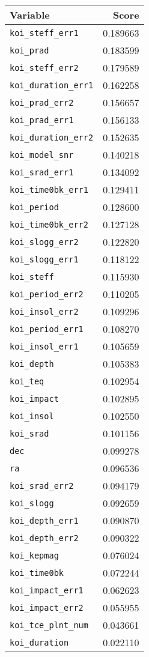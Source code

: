 \begin{tabular}{lr}
\toprule
                     Variable &     Score \\
\midrule
    \texttt{koi\_steff\_err1} &  0.189663 \\
           \texttt{koi\_prad} &  0.183599 \\
    \texttt{koi\_steff\_err2} &  0.179589 \\
 \texttt{koi\_duration\_err1} &  0.162258 \\
     \texttt{koi\_prad\_err2} &  0.156657 \\
     \texttt{koi\_prad\_err1} &  0.156133 \\
 \texttt{koi\_duration\_err2} &  0.152635 \\
     \texttt{koi\_model\_snr} &  0.140218 \\
     \texttt{koi\_srad\_err1} &  0.134092 \\
  \texttt{koi\_time0bk\_err1} &  0.129411 \\
         \texttt{koi\_period} &  0.128600 \\
  \texttt{koi\_time0bk\_err2} &  0.127128 \\
    \texttt{koi\_slogg\_err2} &  0.122820 \\
    \texttt{koi\_slogg\_err1} &  0.118122 \\
          \texttt{koi\_steff} &  0.115930 \\
   \texttt{koi\_period\_err2} &  0.110205 \\
    \texttt{koi\_insol\_err2} &  0.109296 \\
   \texttt{koi\_period\_err1} &  0.108270 \\
    \texttt{koi\_insol\_err1} &  0.105659 \\
          \texttt{koi\_depth} &  0.105383 \\
            \texttt{koi\_teq} &  0.102954 \\
         \texttt{koi\_impact} &  0.102895 \\
          \texttt{koi\_insol} &  0.102550 \\
           \texttt{koi\_srad} &  0.101156 \\
                 \texttt{dec} &  0.099278 \\
                  \texttt{ra} &  0.096536 \\
     \texttt{koi\_srad\_err2} &  0.094179 \\
          \texttt{koi\_slogg} &  0.092659 \\
    \texttt{koi\_depth\_err1} &  0.090870 \\
    \texttt{koi\_depth\_err2} &  0.090322 \\
         \texttt{koi\_kepmag} &  0.076024 \\
        \texttt{koi\_time0bk} &  0.072244 \\
   \texttt{koi\_impact\_err1} &  0.062623 \\
   \texttt{koi\_impact\_err2} &  0.055955 \\
 \texttt{koi\_tce\_plnt\_num} &  0.043661 \\
       \texttt{koi\_duration} &  0.022110 \\
\bottomrule
\end{tabular}
